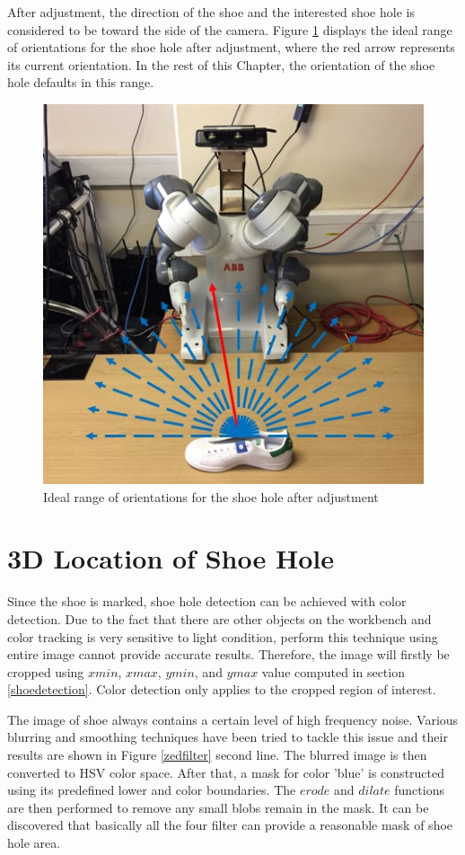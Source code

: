 After adjustment, the direction of the shoe and the interested shoe hole is considered to be toward the side of the camera. Figure \ref{rangeshoe} displays the ideal range of orientations for the shoe hole after adjustment, where the red arrow represents its current orientation. In the rest of this Chapter, the orientation of the shoe hole defaults in this range.

\begin{figure}[H]
\centering
\includegraphics[width = 0.5\columnwidth]{Implementation/cv/rangetoward.jpg}
\caption{Ideal range of orientations for the shoe hole after adjustment}
\label{rangeshoe}
\end{figure}


\section{3D Location of Shoe Hole} \label{3dlocationestimation}
Since the shoe is marked, shoe hole detection can be achieved with color detection. Due to the fact that there are other objects on the workbench and color tracking is very sensitive to light condition, perform this technique using entire image cannot provide accurate results. Therefore, the image will firstly be cropped using $xmin$, $xmax$, $ymin$, and $ymax$ value computed in section \ref{shoedetection}. Color detection only applies to the cropped region of interest.

The image of shoe always contains a certain level of high frequency noise. Various blurring and smoothing techniques have been tried to tackle this issue and their results are shown in Figure \ref{zedfilter} second line. The blurred image is then converted to HSV color space. After that, a mask for color 'blue' is constructed using its predefined lower and color boundaries. The $erode$ and $dilate$ functions are then performed to remove any small blobs remain in the mask. It can be discovered that basically all the four filter can provide a reasonable mask of shoe hole area.

